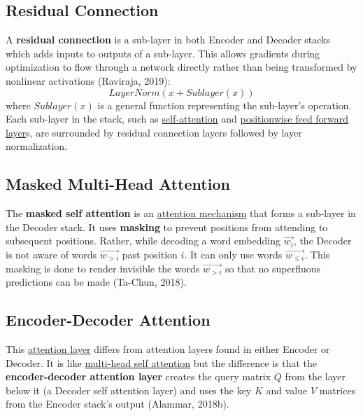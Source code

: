 \subsection{Residual Connection} \label{sec:ResidualConnections}

A \textbf{residual connection} is a sub-layer in both Encoder and Decoder stacks which adds inputs to outputs of a sub-layer. This allows gradients during optimization to flow through a network directly rather than being transformed by nonlinear activations (Raviraja, 2019): 
$$
\textit{LayerNorm}(x + \textit{Sublayer}(x))
$$
where $\textit{Sublayer}(x)$ is a general function representing the sub-layer's operation. Each sub-layer in the stack, such as \hyperref[sec:SelfAttention]{self-attention} and \hyperref[sec:PositionwiseFFNLayers]{positionwise feed forward layer}s, are surrounded by residual connection layers followed by layer normalization. 




\subsection{Masked Multi-Head Attention} \label{sec:MaskedMultiHeadAttention}

The \textbf{masked self attention} is an \hyperref[sec:AttentionMechanism]{attention mechanism} that forms a sub-layer in the Decoder stack. It uses \textbf{masking} to prevent positions from attending to subsequent positions. Rather, while decoding a word embedding $\overrightarrow{w_i}$, the Decoder is not aware of words  $\overrightarrow{w_{>i}}$ past position $i$. It can only use words $\overrightarrow{w_{\leq i}}$. This masking is done to render invisible the words $\overrightarrow{w_{>i}}$ so that no superfluous predictions can be made (Ta-Chun, 2018). 

\subsection{Encoder-Decoder Attention} \label{sec:EncoderDecoderAttention}

This \hyperref[sec:AttentionMechanism]{attention layer} differs from attention layers found in either Encoder or Decoder. It is like \hyperref[sec:MultiHeadAttention]{multi-head self attention} but the difference is that the \textbf{encoder-decoder attention layer} creates the query matrix $Q$ from the layer below it (a Decoder self attention layer) and uses the key $K$ and value $V$ matrices from the Encoder stack's output (Alammar, 2018b). 



